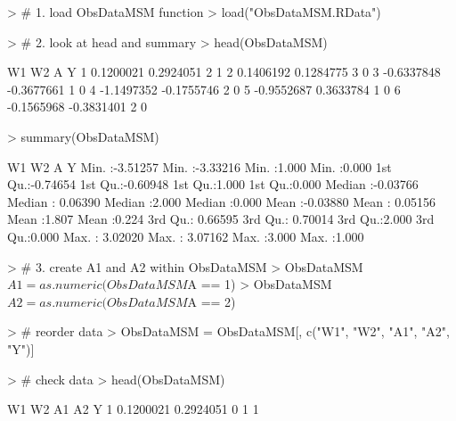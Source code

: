 \documentclass[answers]{exam}
\begin{document}
\begin{solution}
\begin{Schunk}
\begin{Sinput}
> # 1. load ObsDataMSM function
> load("ObsDataMSM.RData")
\end{Sinput}
\end{Schunk}
\begin{Schunk}
\begin{Sinput}
> # 2. look at head and summary
> head(ObsDataMSM)
\end{Sinput}
\begin{Soutput}
          W1         W2 A Y
1  0.1200021  0.2924051 2 1
2  0.1406192  0.1284775 3 0
3 -0.6337848 -0.3677661 1 0
4 -1.1497352 -0.1755746 2 0
5 -0.9552687  0.3633784 1 0
6 -0.1565968 -0.3831401 2 0
\end{Soutput}
\begin{Sinput}
> summary(ObsDataMSM)
\end{Sinput}
\begin{Soutput}
       W1                 W2                 A               Y        
 Min.   :-3.51257   Min.   :-3.33216   Min.   :1.000   Min.   :0.000  
 1st Qu.:-0.74654   1st Qu.:-0.60948   1st Qu.:1.000   1st Qu.:0.000  
 Median :-0.03766   Median : 0.06390   Median :2.000   Median :0.000  
 Mean   :-0.03880   Mean   : 0.05156   Mean   :1.807   Mean   :0.224  
 3rd Qu.: 0.66595   3rd Qu.: 0.70014   3rd Qu.:2.000   3rd Qu.:0.000  
 Max.   : 3.02020   Max.   : 3.07162   Max.   :3.000   Max.   :1.000  
\end{Soutput}
\end{Schunk}
\begin{Schunk}
\begin{Sinput}
> # 3. create A1 and A2 within ObsDataMSM
> ObsDataMSM$A1 = as.numeric(ObsDataMSM$A == 1)
> ObsDataMSM$A2 = as.numeric(ObsDataMSM$A == 2)
\end{Sinput}
\end{Schunk}
\begin{Schunk}
\begin{Sinput}
> # reorder data
> ObsDataMSM = ObsDataMSM[, c("W1", "W2", "A1", "A2", "Y")]
\end{Sinput}
\end{Schunk}
\begin{Schunk}
\begin{Sinput}
> # check data
> head(ObsDataMSM)
\end{Sinput}
\begin{Soutput}
          W1         W2 A1 A2 Y
1  0.1200021  0.2924051  0  1 1

\end{Soutput}
\end{Schunk}
\end{solution}
\end{document}
